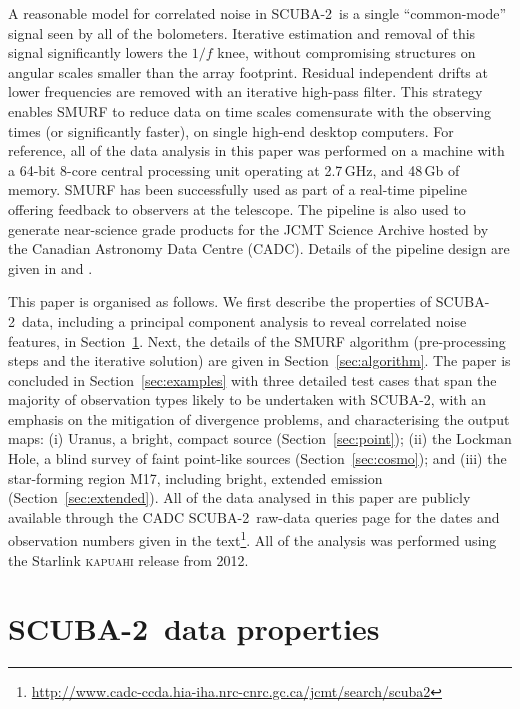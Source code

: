 \documentclass[useAMS,usenatbib,nofootinbib]{mn2e}
\newcommand{\scuba}{SCUBA-2}
\begin{document}
A reasonable model for correlated noise in \scuba\ is a single
``common-mode'' signal seen by all of the bolometers. Iterative
estimation and removal of this signal significantly lowers the $1/f$
knee, without compromising structures on angular scales smaller than
the array footprint. Residual independent drifts at lower frequencies
are removed with an iterative high-pass filter. This strategy enables
SMURF to reduce data on time scales comensurate with the observing
times (or significantly faster), on single high-end desktop
computers. For reference, all of the data analysis in this paper was
performed on a machine with a 64-bit 8-core central processing unit
operating at 2.7\,GHz, and 48\,Gb of memory. SMURF has been
successfully used as part of a real-time pipeline offering feedback to
observers at the telescope. The pipeline is also used to generate
near-science grade products for the JCMT Science Archive
\citep{2011ASPC..442..203E} hosted by the Canadian Astronomy Data
Centre (CADC). Details of the pipeline design are given in
\citet{gibb2005} and \citet{2008AN....329..295C}.

This paper is organised as follows. We first describe the properties
of \scuba\ data, including a principal component analysis to reveal
correlated noise features, in Section~\ref{sec:data}. Next, the
details of the SMURF algorithm (pre-processing steps and the iterative
solution) are given in Section~\ref{sec:algorithm}. The paper is
concluded in Section~\ref{sec:examples} with three detailed test cases
that span the majority of observation types likely to be undertaken
with \scuba, with an emphasis on the mitigation of divergence
problems, and characterising the output maps: (i) Uranus, a bright,
compact source (Section~\ref{sec:point}); (ii) the Lockman Hole, a
blind survey of faint point-like sources (Section~\ref{sec:cosmo});
and (iii) the star-forming region M17, including bright, extended
emission (Section~\ref{sec:extended}). All of the data analysed in
this paper are publicly available through the CADC \scuba\ raw-data
queries page for the dates and observation numbers given in the
text\footnote{\url{http://www.cadc-ccda.hia-iha.nrc-cnrc.gc.ca/jcmt/search/scuba2}}.
All of the analysis was performed using the Starlink \textsc{kapuahi}
release from 2012.

\section{\scuba\ data properties}
\label{sec:data}
\end{document}
